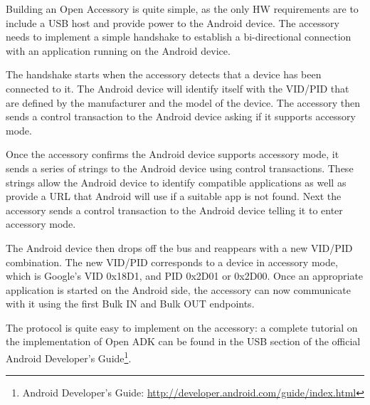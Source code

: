 Building an Open Accessory is quite simple, as the only HW requirements are to include a USB host and provide power to the Android device. The accessory needs to implement a simple handshake to establish a bi-directional connection with an application running on the Android device.

The handshake starts when the accessory detects that a device has been connected to it. The Android device will identify itself with the VID/PID that are defined by the manufacturer and the model of the device. The accessory then sends a control transaction to the Android device asking if it supports accessory mode.

Once the accessory confirms the Android device supports accessory mode, it sends a series of strings to the Android device using control transactions. These strings allow the Android device to identify compatible applications as well as provide a URL that Android will use if a suitable app is not found. Next the accessory sends a control transaction to the Android device telling it to enter accessory mode.

The Android device then drops off the bus and reappears with a new VID/PID combination. The new VID/PID corresponds to a device in accessory mode, which is Google's VID 0x18D1, and PID 0x2D01 or 0x2D00. Once an appropriate application is started on the Android side, the accessory can now communicate with it using the first Bulk IN and Bulk OUT endpoints.

The protocol is quite easy to implement on the accessory: a complete tutorial on the implementation of Open ADK can be found in the USB section of the official Android Developer's Guide\footnote{Android Developer's Guide: \url{http://developer.android.com/guide/index.html}}.

